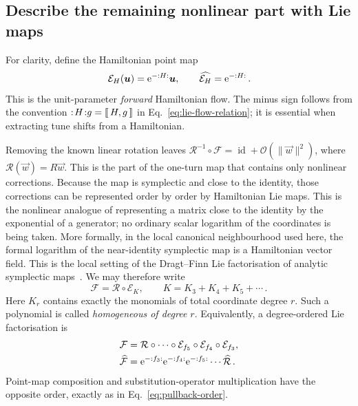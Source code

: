 \subsection{Describe the remaining nonlinear part with Lie maps}

For clarity, define the Hamiltonian point map
\begin{equation}\label{eq:nnf-hamiltonian-point-map}
    \mathcal E_H(\bm{u}) = \mathrm{e}^{-{:{H}:}}\bm{u},
    \qquad \widehat{\mathcal E_H} = \mathrm{e}^{-{:{H}:}}\,.
\end{equation}
This is the unit-parameter \emph{forward} Hamiltonian flow.  The minus sign
follows from the convention ${:\!{H}\!:}g = \llbracket \, H,g\,\rrbracket$ in
Eq.~\eqref{eq:lie-flow-relation}; it is essential when extracting tune
shifts from a Hamiltonian.

Removing the known linear rotation leaves
$\mathcal R^{-1}\circ\mathcal F = \operatorname{id} + \mathcal O(\|\vec w\|^2)$,
where $\mathcal R(\vec w) = R\vec w$.  This is the part of the one-turn map
that contains only nonlinear corrections.  Because the map is symplectic and
close to the identity, those corrections can be represented order by order by
Hamiltonian Lie maps.  This is the nonlinear analogue of representing a
matrix close to the identity by the exponential of a generator; no ordinary
scalar logarithm of the coordinates is being taken.  More formally, in the
local canonical neighbourhood used here, the formal logarithm of the
near-identity symplectic map is a Hamiltonian vector field.  This is the local
setting of the Dragt--Finn Lie factorisation of analytic symplectic
maps~\cite{DragtFinn1976}.  We may therefore write
\begin{equation}\label{eq:nnf-residual-log}
    \mathcal F = \mathcal R\circ\mathcal E_K,
    \qquad K = K_3 + K_4 + K_5 + \cdots\,.
\end{equation}
Here $K_r$ contains exactly the monomials of total coordinate degree $r$.
Such a polynomial is called \emph{homogeneous of degree $r$}.  Equivalently,
a degree-ordered Lie factorisation is
\begin{align}\label{eq:nnf-lie-factorisation}
    \mathcal F
    & = \mathcal R\circ\cdots\circ\mathcal E_{f_5}
    \circ\mathcal E_{f_4}\circ\mathcal E_{f_3},\\
    \widehat{\mathcal F}
    & = \mathrm{e}^{-{:{f_3}:}}\mathrm{e}^{-{:{f_4}:}}
    \mathrm{e}^{-{:{f_5}:}}\cdots\widehat{\mathcal R}\,.
\end{align}
Point-map composition and substitution-operator multiplication have the
opposite order, exactly as in Eq.~\eqref{eq:pullback-order}.

